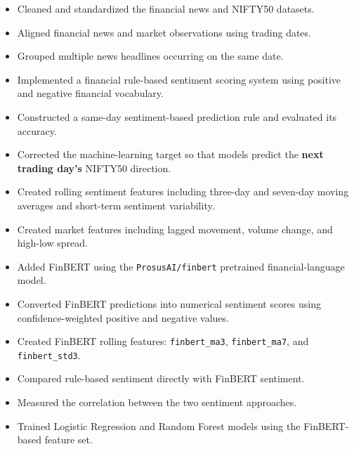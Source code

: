 \documentclass[10pt,a4paper]{article}
\begin{document}
	\begin{itemize}[
		leftmargin=*,
		itemsep=1pt,
		topsep=2pt
		]
		
		\item Cleaned and standardized the financial news and NIFTY50
		datasets.
		
		\item Aligned financial news and market observations using trading
		dates.
		
		\item Grouped multiple news headlines occurring on the same date.
		
		\item Implemented a financial rule-based sentiment scoring system
		using positive and negative financial vocabulary.
		
		\item Constructed a same-day sentiment-based prediction rule and
		evaluated its accuracy.
		
		\item Corrected the machine-learning target so that models predict
		the \textbf{next trading day's} NIFTY50 direction.
		
		\item Created rolling sentiment features including three-day and
		seven-day moving averages and short-term sentiment variability.
		
		\item Created market features including lagged movement, volume
		change, and high-low spread.
		
		\item Added FinBERT using the \texttt{ProsusAI/finbert} pretrained
		financial-language model.
		
		\item Converted FinBERT predictions into numerical sentiment scores
		using confidence-weighted positive and negative values.
		
		\item Created FinBERT rolling features:
		\texttt{finbert\_ma3}, \texttt{finbert\_ma7}, and
		\texttt{finbert\_std3}.
		
		\item Compared rule-based sentiment directly with FinBERT sentiment.
		
		\item Measured the correlation between the two sentiment approaches.
		
		\item Trained Logistic Regression and Random Forest models using the
		FinBERT-based feature set.
		

\end{itemize}
\end{document}
